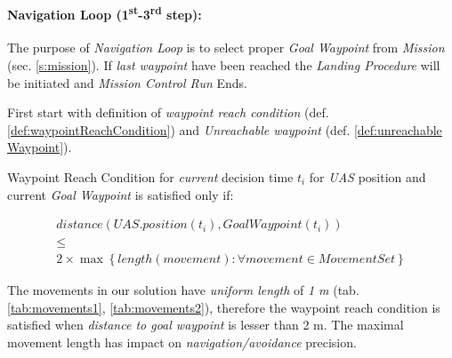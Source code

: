 \paragraph{Navigation Loop (1\textsuperscript{st}-3\textsuperscript{rd} step):} The purpose of \emph{Navigation Loop} is to select proper \emph{Goal Waypoint} from \emph{Mission} (sec. \ref{s:mission}). If \emph{last waypoint} have been reached the \emph{Landing Procedure} will be initiated and \emph{Mission Control Run} Ends.

\noindent First start with definition of \emph{waypoint reach condition} (def. \ref{def:waypointReachCondition}) and \emph{Unreachable waypoint} (def. \ref{def:unreachable Waypoint}).

\newpage
\begin{definition}{Waypoint Reach Condition}\label{def:waypointReachCondition} for \emph{current} decision time $t_i$ for \emph{UAS} position and current \emph{Goal Waypoint} is satisfied only if:

\begin{multline}\label{eq:waypointReachCondition}
    distance(UAS.position(t_i),GoalWaypoint(t_i)) \\\le \\2 \times \max \left\{length(movement):\forall movement\in MovementSet\right\}
\end{multline}

    \begin{note}
        The movements in our solution have \emph{uniform length} of \emph{1 m} (tab. \ref{tab:movements1}, \ref{tab:movements2}), therefore the waypoint reach condition is satisfied when \emph{distance to goal waypoint} is lesser than 2 m. The maximal movement length has impact on \emph{navigation/avoidance} precision.
    \end{note}
\end{definition}

